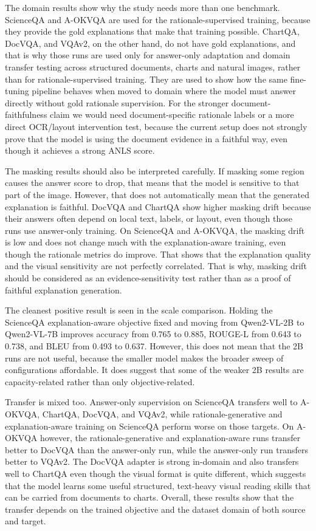 \documentclass[preprint,12pt]{elsarticle}
\begin{document}
The domain results show why the study needs more than one benchmark.
ScienceQA and A-OKVQA are used for the rationale-supervised training, because they provide the gold explanations that make that training possible.
ChartQA, DocVQA, and VQAv2, on the other hand, do not have gold explanations, and that is why those runs are used only for answer-only adaptation 
and domain transfer testing across structured documents, charts and natural images, rather than for rationale-supervised training.
They are used to show how the same fine-tuning pipeline behaves when moved to domain where the model must answer directly without gold rationale supervision.
For the stronger document-faithfulness claim we would need document-specific rationale labels or a more direct OCR/layout intervention test, because the current setup does not strongly prove that the model is using the document evidence in a faithful way, even though it achieves a strong ANLS score.

The masking results should also be interpreted carefully.
If masking some region causes the answer score to drop, that means that the model is sensitive to that part of the image.
However, that does not automatically mean that the generated explanation is faithful.
DocVQA and ChartQA show higher masking drift because their answers often depend on local text, labels, or layout, even though those runs use answer-only training.
On ScienceQA and A-OKVQA, the masking drift is low and does not change much with the explanation-aware training, even though the rationale metrics do improve.
That shows that the explanation quality and the visual sensitivity are not perfectly correlated.
That is why, masking drift should be considered as an evidence-sensitivity test rather than as a proof of faithful explanation generation.

The cleanest positive result is seen in the scale comparison.
Holding the ScienceQA explanation-aware objective fixed and moving from Qwen2-VL-2B to Qwen2-VL-7B improves accuracy from 0.765 to 0.885, ROUGE-L from 0.643 to 0.738, and BLEU from 0.493 to 0.637.
However, this does not mean that the 2B runs are not useful, because the smaller model makes the broader sweep of configurations affordable.
It does suggest that some of the weaker 2B results are capacity-related rather than only objective-related.

Transfer is mixed too.
Answer-only supervision on ScienceQA transfers well to A-OKVQA, ChartQA, DocVQA, and VQAv2, while rationale-generative and explanation-aware training on ScienceQA perform worse on those targets.
On A-OKVQA however, the rationale-generative and explanation-aware runs transfer better to DocVQA than the answer-only run, while the answer-only run transfers better to VQAv2.
The DocVQA adapter is strong in-domain and also transfers well to ChartQA even though the visual format is quite different, which suggests that the model learns some useful structured, text-heavy visual reading skills that can be carried from documents to charts.
Overall, these results show that the transfer depends on the trained objective and the dataset domain of both source and target.
\end{document}
